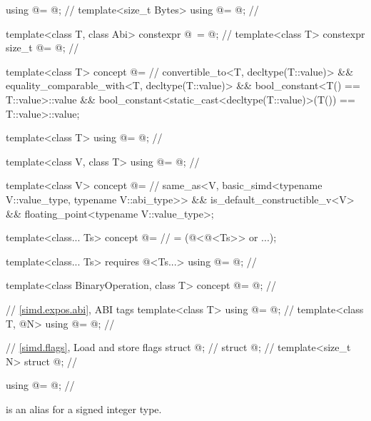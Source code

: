 \begin{codeblock}
using @\simdsizetype@ = @\seebelow@;                                 // \expos
template<size_t Bytes> using @\integerfrom@ = @\seebelow@;            // \expos

template<class T, class Abi>
  constexpr @\simdsizetype\ \simdsizev@ = @\seebelow@;               // \expos
template<class T> constexpr size_t @\maskelementsize@ = @\seebelow@; // \expos

template<class T>
  concept @\constexprwrapperlike@ =                                // \expos
    convertible_to<T, decltype(T::value)> &&
    equality_comparable_with<T, decltype(T::value)> &&
    bool_constant<T() == T::value>::value &&
    bool_constant<static_cast<decltype(T::value)>(T()) == T::value>::value;

template<class T> using @\deducedsimd@ = @\seebelow@;               // \expos

template<class V, class T> using @\makecompatiblesimdt@ = @\seebelow@; // \expos

template<class V>
  concept @\simdfloatingpoint@ =                                   // \expos
    same_as<V, basic_simd<typename V::value_type, typename V::abi_type>> &&
    is_default_constructible_v<V> && floating_point<typename V::value_type>;

template<class... Ts>
  concept @\mathfloatingpoint@ =                                   // \expos
    = (@\simdfloatingpoint@<@\deducedsimd@<Ts>> or ...);

template<class... Ts>
  requires @\mathfloatingpoint@<Ts...>
    using @\mathcommonsimd@ = @\seebelow@;                         // \expos

template<class BinaryOperation, class T>
  concept @\reductionoperation@ = @\seebelow@;                     // \expos

// \ref{simd.expos.abi},  ABI tags
template<class T> using @\nativeabi@ = @\seebelow@;                   // \expos
template<class T, @\simdsizetype@ N> using @\deducet@ = @\seebelow@;   // \expos

// \ref{simd.flags}, Load and store flags
struct @\convertflag@;                                              // \expos
struct @\alignedflag@;                                              // \expos
template<size_t N> struct @\overalignedflag@;                       // \expos
\end{codeblock}

\begin{itemdecl}
using @\simdsizetype@ = @\seebelow@; // \expos
\end{itemdecl}
\begin{itemdescr}
  \pnum
  \simdsizetype{} is an alias for a signed integer type.
\end{itemdescr}


